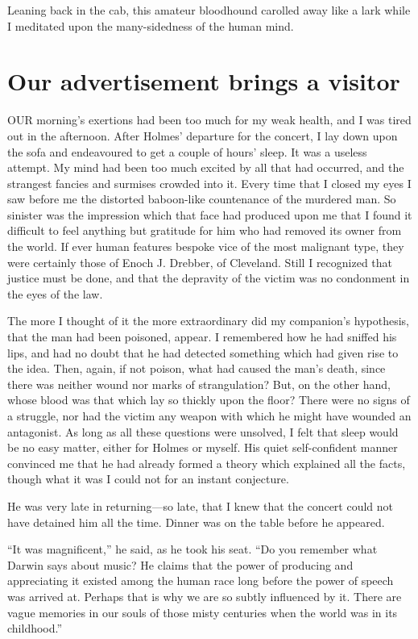 \documentclass[12pt]{book}
\begin{document}
Leaning back in the cab, this amateur bloodhound carolled away like a lark while I meditated upon the many-sidedness of the human mind. 







\chapter{Our advertisement brings a visitor} 

OUR morning’s exertions had been too much for my weak health, and I was tired out in the afternoon. After Holmes’ departure for the concert, I lay down upon the sofa and endeavoured to get a couple of hours’ sleep. It was a useless attempt. My mind had been too much excited by all that had occurred, and the strangest fancies and surmises crowded into it. Every time that I closed my eyes I saw before me the distorted baboon-like countenance of the murdered man. So sinister was the impression which that face had produced upon me that I found it difficult to feel anything but gratitude for him who had removed its owner from the world. If ever human features bespoke vice of the most malignant type, they were certainly those of Enoch J. Drebber, of Cleveland. Still I recognized that justice must be done, and that the depravity of the victim was no condonment in the eyes of the law. 

The more I thought of it the more extraordinary did my companion’s hypothesis, that the man had been poisoned, appear. I remembered how he had sniffed his lips, and had no doubt that he had detected something which had given rise to the idea. Then, again, if not poison, what had caused the man’s death, since there was neither wound nor marks of strangulation? But, on the other hand, whose blood was that which lay so thickly upon the floor? There were no signs of a struggle, nor had the victim any weapon with which he might have wounded an antagonist. As long as all these questions were unsolved, I felt that sleep would be no easy matter, either for Holmes or myself. His quiet self-confident manner convinced me that he had already formed a theory which explained all the facts, though what it was I could not for an instant conjecture. 

He was very late in returning—so late, that I knew that the concert could not have detained him all the time. Dinner was on the table before he appeared. 

“It was magnificent,” he said, as he took his seat. “Do you remember what Darwin says about music? He claims that the power of producing and appreciating it existed among the human race long before the power of speech was arrived at. Perhaps that is why we are so subtly influenced by it. There are vague memories in our souls of those misty centuries when the world was in its childhood.” 
\end{document}
